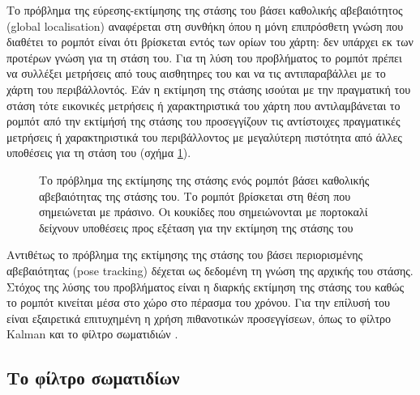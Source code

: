 Το πρόβλημα της εύρεσης-εκτίμησης της στάσης του βάσει καθολικής αβεβαιότητος
(global localisation) αναφέρεται στη συνθήκη όπου η μόνη επιπρόσθετη γνώση που
διαθέτει το ρομπότ είναι ότι βρίσκεται εντός των ορίων του χάρτη: δεν υπάρχει
εκ των προτέρων γνώση για τη στάση του. Για τη λύση του προβλήματος το ρομπότ
πρέπει να συλλέξει μετρήσεις από τους αισθητηρες του και να τις αντιπαραβάλλει
με το χάρτη του περιβάλλοντός. Εάν η εκτίμηση της στάσης ισούται με την
πραγματική του στάση τότε εικονικές μετρήσεις ή χαρακτηριστικά του χάρτη που
αντιλαμβάνεται το ρομπότ από την εκτίμήσή της στάσης του προσεγγίζουν τις
αντίστοιχες πραγματικές μετρήσεις ή χαρακτηριστικά του περιβάλλοντος με
μεγαλύτερη πιστότητα από άλλες υποθέσεις για τη στάση του (σχήμα
\ref{fig:global_localisation}).

\begin{figure}[htbp]\centering
  
  \caption{\small Το πρόβλημα της εκτίμησης της στάσης ενός ρομπότ βάσει καθολικής
           αβεβαιότητας της στάσης του. Το ρομπότ βρίσκεται στη θέση που
           σημειώνεται με πράσινο. Οι κουκίδες που σημειώνονται με πορτοκαλί
           δείχνουν υποθέσεις προς εξέταση για την εκτίμηση της στάσης του}
  \label{fig:global_localisation}
\end{figure}

Αντιθέτως το πρόβλημα της εκτίμησης της στάσης του βάσει περιορισμένης
αβεβαιότητας (pose tracking) δέχεται ως δεδομένη τη γνώση της αρχικής του
στάσης. Στόχος της λύσης του προβλήματος είναι η διαρκής εκτίμηση της στάσης
του καθώς το ρομπότ κινείται μέσα στο χώρο στο πέρασμα του χρόνου. Για την
επίλυσή του είναι εξαιρετικά επιτυχημένη η χρήση πιθανοτικών προσεγγίσεων, όπως
το φίλτρο Kalman \cite{Maybeck1979} και το φίλτρο σωματιδιών
\cite{Thrun2002a,Gustafsson2002}.

\subsection{Το φίλτρο σωματιδίων}
\label{subsec:01_01_02_3}

